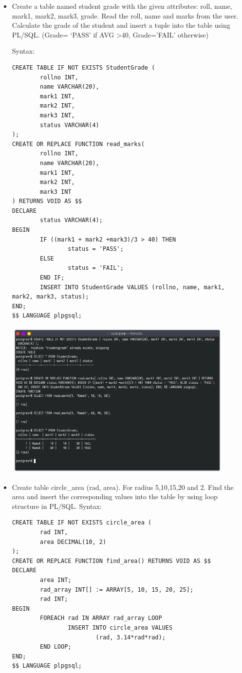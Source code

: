 \documentclass[13pt,oneside]{book}
\begin{document}
\begin{itemize}
\item
Create a table named student grade with the given attributes:
 roll, name, mark1, mark2, mark3, grade. Read the roll, name and marks from the user.
 Calculate the grade of the student and insert a tuple into the table using PL/SQL.
 (Grade= `PASS' if AVG >40, Grade='FAIL' otherwise)
 
 
Syntax:
\begin{verbatim}
CREATE TABLE IF NOT EXISTS StudentGrade (
        rollno INT,
        name VARCHAR(20),
        mark1 INT,
        mark2 INT,
        mark3 INT,
        status VARCHAR(4)
);
CREATE OR REPLACE FUNCTION read_marks(
        rollno INT,
        name VARCHAR(20),
        mark1 INT,
        mark2 INT,
        mark3 INT
) RETURNS VOID AS $$
DECLARE
        status VARCHAR(4);
BEGIN
        IF ((mark1 + mark2 +mark3)/3 > 40) THEN
                status = 'PASS';
        ELSE 
                status = 'FAIL';
        END IF;
        INSERT INTO StudentGrade VALUES (rollno, name, mark1, mark2, mark3, status);
END;
$$ LANGUAGE plpgsql;

\end{verbatim}
\includegraphics[width=0.9\textwidth]{img/p9/ss3.png}


\item
Create table circle\_area (rad, area). For radius 5,10,15,20 and 2. Find the area and
insert the corresponding values into the table by using loop structure in PL/SQL.
Syntax:
\begin{verbatim}
CREATE TABLE IF NOT EXISTS circle_area (
        rad INT,
        area DECIMAL(10, 2)
);
CREATE OR REPLACE FUNCTION find_area() RETURNS VOID AS $$
DECLARE
        area INT;
        rad_array INT[] := ARRAY[5, 10, 15, 20, 25];
        rad INT;
BEGIN
        FOREACH rad IN ARRAY rad_array LOOP
                INSERT INTO circle_area VALUES 
                        (rad, 3.14*rad*rad);
        END LOOP;
END;
$$ LANGUAGE plpgsql;


\end{verbatim}
\end{itemize}
\end{document}

